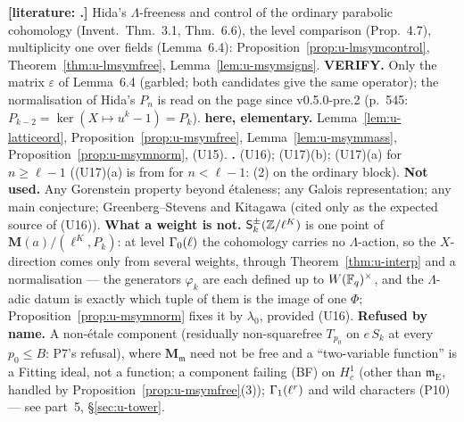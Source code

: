 \documentclass[11pt]{article}
\newcommand{\LIT}[1]{\textsf{[literature: #1]}}   %
\newcommand{\VERIFYloc}{\textsf{VERIFY}}          %
\newcommand{\Iw}{\Lambda}                         %
\newcommand{\Pk}[1]{P_{#1}}                       %
\newcommand{\Eis}{\mathrm{E}}
\begin{document}
\begin{remark}\label{rmk:u-msymbasis}
\textbf{\LIT.} Hida's $\Iw$-freeness and control of the ordinary parabolic cohomology (Invent.\ Thm.~3.1, Thm.~6.6), the level comparison (Prop.~4.7), multiplicity one over fields (Lemma~6.4):
Proposition~\ref{prop:u-lmsymcontrol}, Theorem~\ref{thm:u-lmsymfree}, Lemma~\ref{lem:u-msymsigns}. \textbf{\VERIFYloc.} Only the matrix $\varepsilon$ of Lemma~6.4 (garbled; both candidates give
the same operator); the normalisation of Hida's $P_n$ is read on the page since v0.5.0-pre.2 (p.~545: $P_{k-2}=\ker(X\mapsto u^{k}-1)=\Pk{k}$).
\textbf{\PROVED{} here, elementary.} Lemma~\ref{lem:u-latticeord}, Proposition~\ref{prop:u-msymfree}, Lemma~\ref{lem:u-msymmass}, Proposition~\ref{prop:u-msymnorm}, (U15). \textbf{\CONJ.} (U16); (U17)(b);
(U17)(a) for $n\ge\ell-1$ ((U17)(a) is \PROVED{} from \STD{} for $n<\ell-1$: (2) on the ordinary block).
\textbf{Not used.} Any Gorenstein property beyond étaleness; any Galois representation; any main conjecture; Greenberg--Stevens and Kitagawa (cited only as the expected source of (U16)).
\textbf{What a weight is not.} $\mathsf S^{\pm}_k(\mathbb{Z}/\ell^{K})$ is one point of $\mathbf M(a)/(\ell^{K},\Pk{k})$: at level $\Gamma_0(\ell)$ the cohomology carries no $\Iw$-action, so the $X$-direction comes only
from several weights, through Theorem~\ref{thm:u-interp} and a normalisation --- the generators $\varphi_k$ are each defined up to $W(\mathbb{F}_q)^{\times}$, and the $\Iw$-adic datum is exactly which
tuple of them is the image of one $\Phi$; Proposition~\ref{prop:u-msymnorm} fixes it by $\lambda_0$, provided (U16). \textbf{Refused by name.} A non-étale component (residually non-squarefree
$T_{p_0}$ on $e\,S_k$ at every $p_0\le B$: P7's refusal), where $\mathbf M_{\mathfrak m}$ need not be free and a ``two-variable function'' is a Fitting ideal, not a function; a component failing (BF) on
$H^{1}_c$ (other than $\mathfrak m_\Eis$, handled by Proposition~\ref{prop:u-msymfree}(3)); $\Gamma_1(\ell^{r})$ and wild characters (P10) --- see part~5, \S\ref{sec:u-tower}.
\end{remark}
\end{document}
